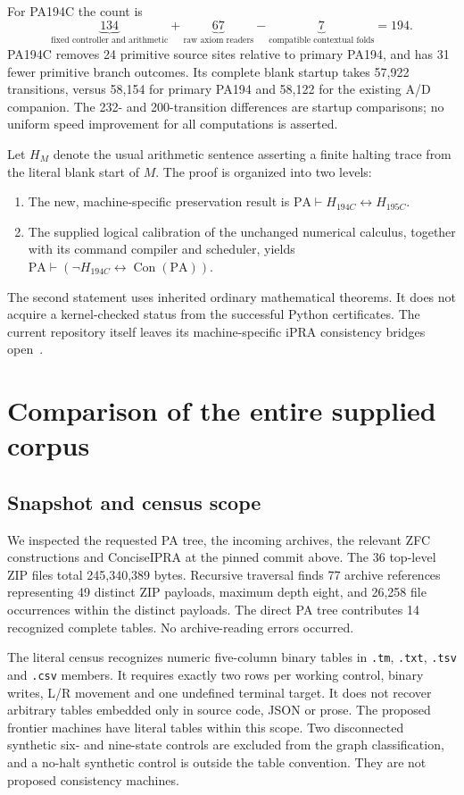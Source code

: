 \documentclass[11pt,letterpaper]{article}
\newcommand{\PA}{\mathrm{PA}}
\newcommand{\Con}{\operatorname{Con}}
\newcommand{\file}[1]{\texttt{\nolinkurl{#1}}}
\begin{document}
For PA194C the count is
\[
 \underbrace{134}_{\text{fixed controller and arithmetic}}
 +\underbrace{67}_{\text{raw axiom readers}}
 -\underbrace{7}_{\text{compatible contextual folds}}=194.
\]
PA194C removes 24 primitive source sites relative to primary PA194,
and has 31 fewer primitive branch outcomes. Its complete blank startup
takes 57,922 transitions, versus 58,154 for primary PA194 and 58,122 for
the existing A/D companion. The 232- and 200-transition differences are
startup comparisons; no uniform speed improvement for all computations
is asserted.

Let $H_M$ denote the usual arithmetic sentence asserting a finite halting
trace from the literal blank start of $M$. The proof is organized into
two levels:
\begin{enumerate}
\item The new, machine-specific preservation result is
      $\PA\vdash H_{194C}\leftrightarrow H_{195C}$.
\item The supplied logical calibration of the unchanged numerical
      calculus, together with its command compiler and scheduler, yields
      $\PA\vdash(\neg H_{194C}\leftrightarrow\Con(\PA))$.
\end{enumerate}
The second statement uses inherited ordinary mathematical theorems.
It does not acquire a kernel-checked status from the successful Python
certificates. The current repository itself leaves its machine-specific
iPRA consistency bridges open~\cite{pa-readme,pa194-endpoint}.

\section{Comparison of the entire supplied corpus}
\label{sec:comparison}

\subsection{Snapshot and census scope}

We inspected the requested PA tree, the incoming archives, the relevant
ZFC constructions and ConciseIPRA at the pinned commit above.
The 36 top-level ZIP files total 245,340,389 bytes. Recursive traversal
finds 77 archive references representing 49 distinct ZIP payloads,
maximum depth eight, and 26,258 file occurrences within the distinct
payloads. The direct PA tree contributes 14 recognized complete tables.
No archive-reading errors occurred.

The literal census recognizes numeric five-column binary tables in
\file{.tm}, \file{.txt}, \file{.tsv} and \file{.csv} members. It requires
exactly two rows per working control, binary writes, L/R movement and
one undefined terminal target. It does not recover arbitrary tables
embedded only in source code, JSON or prose. The proposed frontier
machines have literal tables within this scope. Two disconnected
synthetic six- and nine-state controls are excluded from the graph
classification, and a no-halt synthetic control is outside the table
convention. They are not proposed consistency machines.
\end{document}

